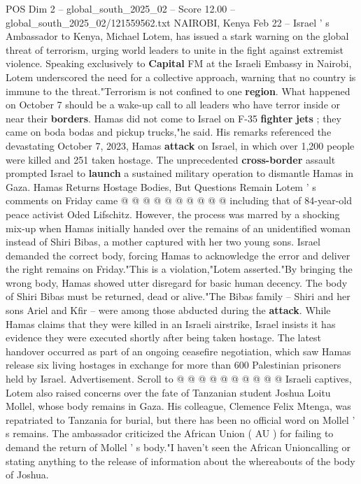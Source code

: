 \begin{textsample}{POS Dim 2 – global\_south\_2025\_02 – Score 12.00 – global\_south\_2025\_02/121559562.txt}  \label{ex:f2_pos_373}
NAIROBI, Kenya Feb 22 -- Israel ' s Ambassador to Kenya, Michael Lotem, has issued a stark warning on the global threat of terrorism, urging world leaders to unite in the fight against extremist violence.
Speaking exclusively to \textbf{Capital} FM at the Israeli Embassy in Nairobi, Lotem underscored the need for a collective approach, warning that no country is immune to the threat."Terrorism is not confined to one \textbf{region}.
What happened on October 7 should be a wake-up call to all leaders who have terror inside or near their \textbf{borders}.
Hamas did not come to Israel on F-35 \textbf{fighter} \textbf{jets} ; they came on boda bodas and pickup trucks,"he said.
His remarks referenced the devastating October 7, 2023, Hamas \textbf{attack} on Israel, in which over 1,200 people were killed and 251 taken hostage.
The unprecedented \textbf{cross-border} assault prompted Israel to \textbf{launch} a sustained military operation to dismantle Hamas in Gaza.
Hamas Returns Hostage Bodies, But Questions Remain Lotem ' s comments on Friday came @ @ @ @ @ @ @ @ @ @ including that of 84-year-old peace activist Oded Lifschitz.
However, the process was marred by a shocking mix-up when Hamas initially handed over the remains of an unidentified woman instead of Shiri Bibas, a mother captured with her two young sons.
Israel demanded the correct body, forcing Hamas to acknowledge the error and deliver the right remains on Friday."This is a violation,"Lotem asserted."By bringing the wrong body, Hamas showed utter disregard for basic human decency.
The body of Shiri Bibas must be returned, dead or alive."The Bibas family -- Shiri and her sons Ariel and Kfir -- were among those abducted during the \textbf{attack}.
While Hamas claims that they were killed in an Israeli airstrike, Israel insists it has evidence they were executed shortly after being taken hostage.
The latest handover occurred as part of an ongoing ceasefire negotiation, which saw Hamas release six living hostages in exchange for more than 600 Palestinian prisoners held by Israel.
Advertisement.
Scroll to @ @ @ @ @ @ @ @ @ @ Israeli captives, Lotem also raised concerns over the fate of Tanzanian student Joshua Loitu Mollel, whose body remains in Gaza.
His colleague, Clemence Felix Mtenga, was repatriated to Tanzania for burial, but there has been no official word on Mollel ' s remains.
The ambassador criticized the African Union ( AU ) for failing to demand the return of Mollel ' s body."I haven't seen the African Unioncalling or stating anything to the release of information about the whereabouts of the body of Joshua.

\end{textsample}
